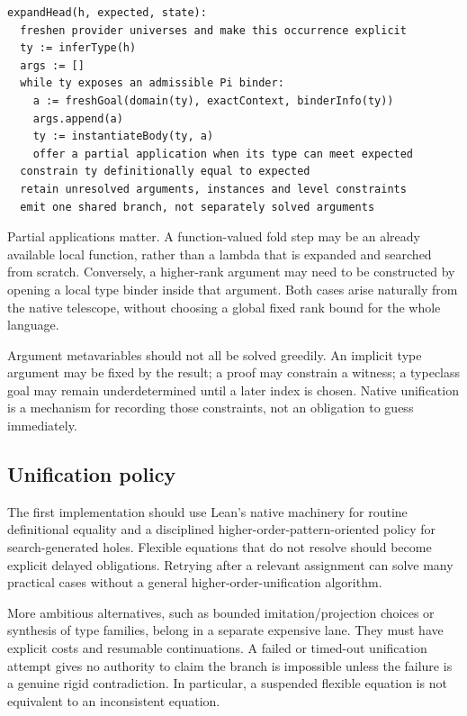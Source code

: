 \par\noindent\begin{minipage}{\linewidth}
\begin{lstlisting}[language={}]
expandHead(h, expected, state):
  freshen provider universes and make this occurrence explicit
  ty := inferType(h)
  args := []
  while ty exposes an admissible Pi binder:
    a := freshGoal(domain(ty), exactContext, binderInfo(ty))
    args.append(a)
    ty := instantiateBody(ty, a)
    offer a partial application when its type can meet expected
  constrain ty definitionally equal to expected
  retain unresolved arguments, instances and level constraints
  emit one shared branch, not separately solved arguments
\end{lstlisting}
\end{minipage}\par

Partial applications matter. A function-valued fold step may be an already available local function, rather than a lambda that is expanded and searched from scratch. Conversely, a higher-rank argument may need to be constructed by opening a local type binder inside that argument. Both cases arise naturally from the native telescope, without choosing a global fixed rank bound for the whole language.

Argument metavariables should not all be solved greedily. An implicit type argument may be fixed by the result; a proof may constrain a witness; a typeclass goal may remain underdetermined until a later index is chosen. Native unification is a mechanism for recording those constraints, not an obligation to guess immediately.

\subsection{Unification policy}

The first implementation should use Lean's native machinery for routine definitional equality and a disciplined higher-order-pattern-oriented policy for search-generated holes. Flexible equations that do not resolve should become explicit delayed obligations. Retrying after a relevant assignment can solve many practical cases without a general higher-order-unification algorithm.

More ambitious alternatives, such as bounded imitation/projection choices or synthesis of type families, belong in a separate expensive lane. They must have explicit costs and resumable continuations. A failed or timed-out unification attempt gives no authority to claim the branch is impossible unless the failure is a genuine rigid contradiction. In particular, a suspended flexible equation is not equivalent to an inconsistent equation.

